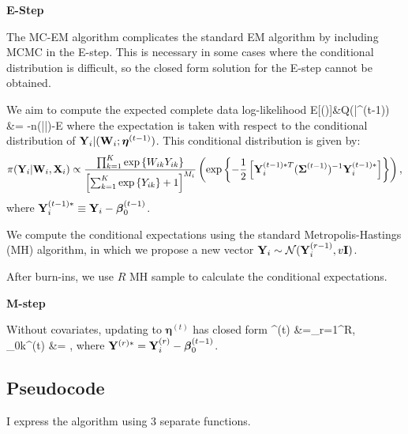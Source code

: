 \documentclass{template}
\begin{document}
\noindent\textbf{E-Step}

The MC-EM algorithm complicates the standard EM algorithm by including MCMC in the E-step. This is necessary in some cases where the conditional distribution is difficult, so the closed form solution for the E-step cannot be obtained.

We aim to compute the expected complete data log-likelihood \bal 
E[\ell(\boldsymbol{\eta})]&\equiv Q(\boldsymbol{\eta}|\boldsymbol{\eta}^{(t-1)})\\
&= -n\log(|\boldsymbol{\Sigma}|)-\sumi E
\eal 
where the expectation is taken with respect to the conditional distribution of $\mathbf{Y}_i|(\mathbf{W}_i; \boldsymbol{\eta}^{(t-1)})$. This conditional distribution is  given by: 
\begin{equation}
    \pi(\mathbf{Y}_i|\mathbf{W}_i,\mathbf{X}_i) \propto \dfrac{\prod_{k=1}^K \text{exp}\left\{W_{ik}Y_{ik}\right\}}{\left[\sum_{k=1}^K \text{exp}\left\{Y_{ik}\right\}+1\right]^{M_i}} \left(\text{exp}\left\{-\dfrac{1}{2}\left[\mathbf{Y}_i^{(t-1)*T}(\boldsymbol{\Sigma}^{(t-1)})^{-1}\mathbf{Y}_i^{(t-1)*}\right]\right\}\right),
\end{equation}
where $\mathbf{Y}_i^{(t-1)*}\equiv \mathbf{Y}_i- \boldsymbol{\beta}_0^{(t-1)}$.

We compute the conditional expectations using the standard Metropolis-Hastings (MH) algorithm, in which we propose a new vector $\mathbf{Y}_i\sim \mathcal{N}(\mathbf{Y}_i^{(r-1)},v\mathbf{I})$.

After burn-ins, we use $R$ MH sample to calculate the conditional expectations.

\noindent\textbf{M-step}

Without covariates, updating to  $\boldsymbol{\eta}^{(t)}$ has closed form
\bal 
\boldsymbol{\Sigma}^{(t)} &=\sum_{r=1}^{R},\\
\boldsymbol{\beta}_{0k}^{(t)} &= \onen\sumi {},
\eal 
where $\mathbf{Y}^{(r)*}=\mathbf{Y}_i^{(r)}-\boldsymbol{\beta}_0^{(t-1)}$.


\subsection{Pseudocode}

 I express the algorithm using 3 separate functions.
\end{document}
